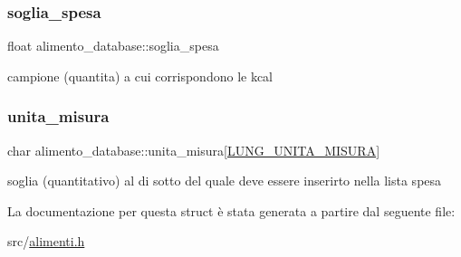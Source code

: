 \subsubsection{\texorpdfstring{soglia\+\_\+spesa}{soglia\_spesa}}
{\footnotesize\ttfamily float alimento\+\_\+database\+::soglia\+\_\+spesa}



campione (quantita) a cui corrispondono le kcal 

\mbox{\label{structalimento__database_acb4c2e16b5b64a473dfd389ccab96a8e}} 
\subsubsection{\texorpdfstring{unita\+\_\+misura}{unita\_misura}}
{\footnotesize\ttfamily char alimento\+\_\+database\+::unita\+\_\+misura\mbox{[}\hyperlink{alimenti_8h_ade0f1f034a3ec6c04b8e29f4730db983}{L\+U\+N\+G\+\_\+\+U\+N\+I\+T\+A\+\_\+\+M\+I\+S\+U\+RA}\mbox{]}}



soglia (quantitativo) al di sotto del quale deve essere inserirto nella lista spesa 



La documentazione per questa struct è stata generata a partire dal seguente file\+:\begin{DoxyCompactItemize}
\item 
src/\hyperlink{alimenti_8h}{alimenti.\+h}\end{DoxyCompactItemize}
